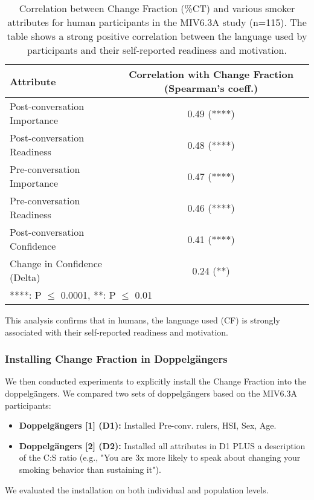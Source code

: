 \begin{table}[h]
\centering
\caption[Correlation of Change Fraction with Smoker Attributes]{Correlation between Change Fraction (\%CT) and various smoker attributes for human participants in the MIV6.3A study (n=115). The table shows a strong positive correlation between the language used by participants and their self-reported readiness and motivation.}
\label{tab:cf_human_correlation}
\begin{tabular}{|l|c|}
\hline
\textbf{Attribute} & \textbf{Correlation with Change Fraction (Spearman's coeff.)} \\ \hline
Post-conversation Importance & 0.49 (****) \\
Post-conversation Readiness & 0.48 (****) \\
Pre-conversation Importance & 0.47 (****) \\
Pre-conversation Readiness & 0.46 (****) \\
Post-conversation Confidence & 0.41 (****) \\
Change in Confidence (Delta) & 0.24 (**) \\ \hline
\multicolumn{2}{l}{\footnotesize{****: P $\leq$ 0.0001, **: P $\leq$ 0.01}}
\end{tabular}
\end{table}

This analysis confirms that in humans, the language used (CF) is strongly associated with their self-reported readiness and motivation.

\subsubsection{Installing Change Fraction in Doppelgängers}

We then conducted experiments to explicitly install the Change Fraction into the doppelgängers. We compared two sets of doppelgängers based on the MIV6.3A participants:
\begin{itemize}
    \item \textbf{Doppelgängers [1] (D1):} Installed Pre-conv. rulers, HSI, Sex, Age.
    \item \textbf{Doppelgängers [2] (D2):} Installed all attributes in D1 PLUS a description of the C:S ratio (e.g., "You are 3x more likely to speak about changing your smoking behavior than sustaining it").
\end{itemize}

We evaluated the installation on both individual and population levels.

